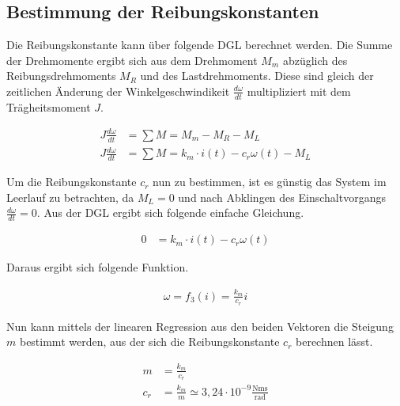 \subsection{Bestimmung der Reibungskonstanten}

Die Reibungskonstante kann über folgende DGL berechnet werden.
Die Summe der Drehmomente ergibt sich aus dem Drehmoment $M_m$
abzüglich des Reibungsdrehmoments $M_R$ und des Lastdrehmoments.
Diese sind gleich der zeitlichen Änderung der Winkelgeschwindikeit 
$\frac{d \omega}{dt}$ multipliziert mit dem Trägheitsmoment $J$.

\begin{equation} \label{eq221}
    \begin{split}
        J \frac{d \omega}{d t} &= \sum M = M_m - M_R - M_L \\
        J \frac{d \omega}{d t} &= \sum M = k_m \cdot i(t) - c_r \omega (t) - M_L 
    \end{split}
\end{equation}

Um die Reibungskonstante $c_r$ nun zu bestimmen, ist es günstig das
System im Leerlauf zu betrachten, da $M_L=0$ und nach Abklingen des
Einschaltvorgangs $\frac{d\omega}{dt} =0$. Aus der DGL ergibt sich
folgende einfache Gleichung.

\begin{equation} \label{eq222}
    \begin{split}
        0 & = k_m \cdot i(t) - c_r \omega (t)
    \end{split}
\end{equation}

Daraus ergibt sich folgende Funktion.

\begin{equation} \label{eq222}
    \begin{split}
        \omega = f_3(i) = \frac{k_m}{c_r} i
    \end{split}
\end{equation}

Nun kann mittels der linearen Regression aus den beiden Vektoren die Steigung
$m$ bestimmt werden, aus der sich die Reibungskonstante $c_r$ berechnen lässt.

\begin{equation} \label{eq218}
    \begin{split}
       m &=  \frac{k_m}{c_r}\\
       c_r &= \frac{k_m}{m} \simeq 3,24 \cdot 10^{-9} \mathrm{\frac{Nm s}{rad}}
    \end{split}
\end{equation}

